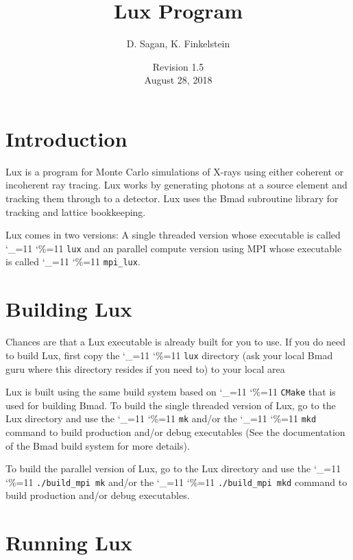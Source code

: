 \documentclass[11pt]{article}
\title{Lux Program}
\author{D. Sagan, K. Finkelstein}
\date{Revision 1.5 \\ August 28, 2018}
\newcommand{\lux}{Lux\xspace}
\newcommand\ttcmd{\begingroup\catcode`\_=11 \catcode`\%=11 \dottcmd}
\newcommand\dottcmd[1]{\texttt{#1}\endgroup}
\newcommand{\vn}{\ttcmd}
\begin{document}
\maketitle

\tableofcontents

\section{Introduction} 
\label{s:intro}

\lux is a program for Monte Carlo simulations of X-rays using either
coherent or incoherent ray tracing. \lux works by generating
photons at a source element and tracking them through to a
detector. \lux uses the Bmad subroutine library\cite{b:bmad} for
tracking and lattice bookkeeping.

\lux comes in two versions: A single threaded version whose executable
is called \vn{lux} and an parallel compute version using MPI whose
executable is called \vn{mpi_lux}.

\section{Building \lux} 
\label{s:build}

Chances are that a \lux executable is already built for you to use. If
you do need to build \lux, first copy the \vn{lux} directory (ask your
local Bmad guru where this directory resides if you need to) to your
local area 

\lux is built using the same build system based on \vn{CMake} that is
used for building Bmad. To build the single threaded version of \lux,
go to the \lux directory and use the \vn{mk} and/or the \vn{mkd}
command to build production and/or debug executables (See the
documentation of the Bmad build system for more details).

To build the parallel version of \lux, go to the \lux directory and
use the \vn{./build_mpi mk} and/or the \vn{./build_mpi mkd} command to
build production and/or debug executables.

\section{Running \lux} 
\label{s:run}
\end{document}
